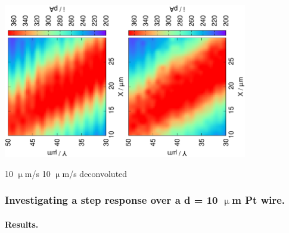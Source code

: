 \documentclass{beamer}
\begin{document}
\begin{frame}
        \centering
        \includegraphics[trim = 10mm 10mm 0mm 10mm, clip, width=0.4\textwidth, angle=-90]{7.eps}\includegraphics[trim = 10mm 30mm 0mm 10mm, clip, width=0.4\textwidth, angle=-90]{7_deconvoluted.eps}

\hspace{1.4cm} 10 $\upmu$m/s \hspace{3cm} 10 $\upmu$m/s deconvoluted

\frametitle{Investigating a step response over a d = 10 $\upmu$m Pt wire.}
        \framesubtitle{Results.}
\vfill
\end{frame}
\end{document}
